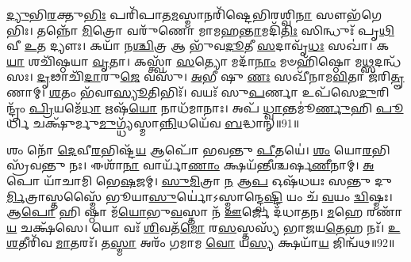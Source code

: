 \-\ul{𑌦𑍍𑌯𑍁}\-𑌭𑌿\-\ul{𑌰}\-𑌕𑍍𑌤𑍁\-\ul{𑌭𑌿𑌃} 𑌪𑌰𑌿᳴𑌪𑌾𑌤\-\ul{𑌮}\-𑌸𑍍𑌮𑌾𑌨𑌰𑌿᳴𑌷𑍍𑌟𑍇𑌭𑌿𑌰𑌶𑍍𑌵𑌿\-\ul{𑌨𑌾} 𑌸𑍗𑌭᳴𑌗𑍇𑌭𑌿𑌃। 
𑌤𑌨𑍍𑌨𑍋᳴ \ul{𑌮𑌿}\-𑌤𑍍𑌰𑍋 𑌵𑌰𑍁᳴𑌣𑍋 𑌮𑌾𑌮𑌹\-\ul{𑌨𑍍𑌤𑌾}\-𑌮𑌦𑌿᳴\-\ul{𑌤𑌿𑌃} 𑌸𑌿𑌨𑍍𑌧𑍁𑌃᳴ 𑌪𑍃\-\ul{𑌥𑌿}\-𑌵𑍀 \ul{𑌉}\-𑌤 𑌦𑍍𑌯𑍗𑌃। 
𑌕𑌯𑌾᳴ 𑌨\-\ul{𑌶𑍍𑌚𑌿}\-𑌤𑍍𑌰 𑌆 𑌭𑍁᳴𑌵\-\ul{𑌦𑍂}\-𑌤𑍀 \ul{𑌸}\-𑌦𑌾𑌵𑍃᳴\-\ul{𑌧𑌃} 𑌸𑌖𑌾॑। 
𑌕\-\ul{𑌯𑌾} 𑌶𑌚𑌿᳴𑌷𑍍𑌠𑌯𑌾 \ul{𑌵𑍃}\-𑌤𑌾। 
𑌕𑌸𑍍𑌤𑍍𑌵𑌾᳴ \ul{𑌸}\-𑌤𑍍𑌯𑍋 𑌮𑌦𑌾᳴\-\ul{𑌨𑌾𑌂} 𑌮𑍞𑌹𑌿᳴𑌷𑍍𑌠𑍋 𑌮\-\ul{𑌥𑍍𑌸}\-𑌦𑌨𑍍𑌧᳴𑌸𑌃। 
\-\ul{𑌦𑍃}\-𑌢𑌾𑌚𑌿᳴\-\ul{𑌦𑌾}\-𑌰𑍁\-\ul{𑌜𑍇} 𑌵𑌸𑍁᳴। 
\-\ul{𑌅}\-𑌭𑍀 𑌷𑍁 \ul{𑌣𑌃} 𑌸𑌖𑍀᳴𑌨𑌾𑌮\-\ul{𑌵𑌿}\-𑌤𑌾 𑌜᳴𑌰𑌿\-\ul{𑌤𑍄}\-𑌣𑌾𑌮𑍍। 
\-\ul{𑌶}\-𑌤𑌂 𑌭᳴𑌵𑌾\-\ul{𑌸𑍍𑌯𑍂}\-𑌤𑌿𑌭𑌿𑌃᳴। 
𑌵𑌯𑌃᳴ 𑌸𑍁\-\ul{𑌪}\-𑌰𑍍𑌣𑌾 𑌉𑌪᳴𑌸𑍇\-\ul{𑌦𑍁}\-𑌰𑌿𑌨𑍍𑌦𑍍𑌰𑌂᳴ \ul{𑌪𑍍𑌰𑌿}\-𑌯𑌮𑍇᳴\-\ul{𑌧𑌾} 𑌋𑌷᳴\-\ul{𑌯𑍋} 𑌨𑌾𑌧᳴𑌮𑌾𑌨𑌾𑌃। 
𑌅𑌪᳴ \ul{𑌧𑍍𑌵𑌾}\-𑌨𑍍𑌤𑌮𑍂॑\-\ul{𑌰𑍍𑌣𑍁}\-𑌹𑌿 \ul{𑌪𑍂}\-𑌰𑍍𑌧𑌿 𑌚𑌕𑍍𑌷𑍁᳴𑌰𑍍𑌮𑍁\-\ul{𑌮𑍁}\-𑌗𑍍𑌧𑍍𑌯᳴𑌸𑍍𑌮𑌾\-\ul{𑌨𑍍𑌨𑌿}\-𑌧𑌯𑍇᳴𑌵 \ul{𑌬}\-𑌦𑍍𑌧𑌾𑌨𑍍॥91॥

𑌶𑌂 𑌨𑍋᳴ \ul{𑌦𑍇}\-𑌵𑍀\-\ul{𑌰}\-𑌭𑌿𑌷𑍍𑌟᳴\-\ul{𑌯} 𑌆𑌪𑍋᳴ 𑌭𑌵𑌨𑍍𑌤𑍁 \ul{𑌪𑍀}\-𑌤𑌯𑍇॑। 
\-\ul{𑌶𑌂} 𑌯𑍋\-\ul{𑌰}\-𑌭𑌿𑌸𑍍𑌰᳴𑌵𑌨𑍍𑌤𑍁 𑌨𑌃। 
𑌈𑌶𑌾᳴\-\ul{𑌨𑌾} 𑌵𑌾𑌰𑍍𑌯𑌾᳴\-\ul{𑌣𑌾𑌂} 𑌕𑍍𑌷𑌯᳴𑌨𑍍𑌤𑍀𑌶𑍍𑌚𑌰𑍍\mbox{}𑌷\-\ul{𑌣𑍀}\-𑌨𑌾𑌮𑍍। 
\-\ul{𑌅}\-𑌪𑍋 𑌯𑌾᳴𑌚𑌾𑌮𑌿 𑌭𑍇\-\ul{𑌷}\-𑌜𑌮𑍍। 
\-\ul{𑌸𑍁}\-\-\ul{𑌮𑌿}\-𑌤𑍍𑌰𑌾 \ul{𑌨} 𑌆\-\ul{𑌪} 𑌓𑌷᳴𑌧𑌯𑌃 𑌸𑌨𑍍𑌤𑍁 𑌦𑍁\-\ul{𑌰𑍍𑌮𑌿}\-𑌤𑍍𑌰𑌾𑌸𑍍𑌤𑌸𑍍𑌮𑍈᳴ 𑌭𑍂𑌯𑌾\-\ul{𑌸𑍁}\-𑌰𑍍𑌯𑍋॑𑌽𑌸𑍍𑌮𑌾𑌨𑍍𑌦𑍍𑌵𑍇\-\ul{𑌷𑍍𑌟𑌿} 𑌯𑌂 𑌚᳴ \ul{𑌵}\-𑌯𑌂 \ul{𑌦𑍍𑌵𑌿}\-𑌷𑍍𑌮𑌃। 
𑌆\-\ul{𑌪𑍋} 𑌹𑌿 𑌷𑍍𑌠𑌾 𑌮᳴\-\ul{𑌯𑍋}\-𑌭𑍁\-\ul{𑌵}\-𑌸𑍍𑌤𑌾 𑌨᳴ \ul{𑌊}\-𑌰𑍍𑌜𑍇 𑌦᳴𑌧𑌾𑌤𑌨। 
\-\ul{𑌮}\-𑌹𑍇 𑌰𑌣𑌾᳴\-\ul{𑌯} 𑌚𑌕𑍍𑌷᳴𑌸𑍇। 
𑌯𑍋 𑌵𑌃᳴ \ul{𑌶𑌿}\-𑌵𑌤᳴\-\ul{𑌮𑍋} 𑌰\-\ul{𑌸}\-𑌸𑍍𑌤𑌸𑍍𑌯᳴ 𑌭𑌾𑌜𑌯\-\ul{𑌤𑍇}\-𑌹 𑌨𑌃᳴। 
\-\ul{𑌉}\-\-\ul{𑌶}\-𑌤𑍀𑌰𑌿᳴𑌵 \ul{𑌮𑌾}\-𑌤𑌰𑌃᳴। 
𑌤\-\ul{𑌸𑍍𑌮𑌾} 𑌅𑌰𑌂᳴ 𑌗𑌮𑌾𑌮 \ul{𑌵𑍋} 𑌯\-\ul{𑌸𑍍𑌯} 𑌕𑍍𑌷𑌯𑌾᳴\-\ul{𑌯} 𑌜𑌿𑌨𑍍𑌵᳴𑌥॥92॥

